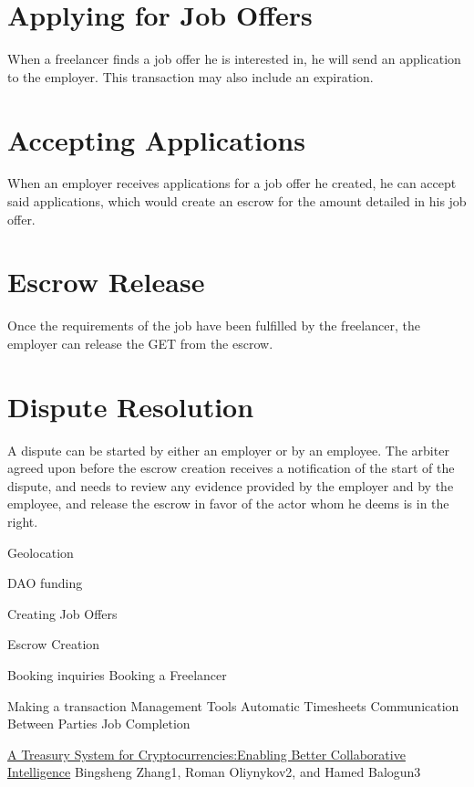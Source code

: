 \documentclass{article}
\begin{document}
\section{Applying for Job Offers}
When a freelancer finds a job offer he is interested in, he will send an application to the employer. This transaction may also include an expiration.

\section{Accepting Applications}
When an employer receives applications for a job offer he created, he can accept said applications, which would create an escrow for the amount detailed in his job offer.

\section{Escrow Release}
Once the requirements of the job have been fulfilled by the freelancer, the employer can release the GET from the escrow.

\section{Dispute Resolution}
A dispute can be started by either an employer or by an employee. The arbiter agreed upon before the escrow creation receives a notification of the start of the dispute, and needs to review any evidence provided by the employer and by the employee, and release the escrow in favor of the actor whom he deems is in the right.

Geolocation

DAO funding


Creating Job Offers



Escrow Creation

Booking inquiries
Booking a Freelancer

Making a transaction
Management Tools
Automatic Timesheets
Communication Between Parties
Job Completion


\begin{thebibliography}{99}

\href{https://www.lancaster.ac.uk/staff/zhangb2/treasury.pdf}{A Treasury System for Cryptocurrencies:Enabling Better Collaborative Intelligence}
Bingsheng Zhang1, Roman Oliynykov2, and Hamed Balogun3

\end{thebibliography}
\end{document}

